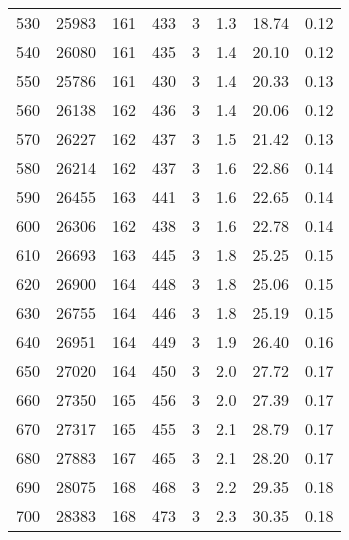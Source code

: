 \begin{table}
\begin{tabular}{S S S S S S S S }
530  & 25983  & 161  & 433  & 3  & 1.3  & 18.74  & 0.12\\ 
540  & 26080  & 161  & 435  & 3  & 1.4  & 20.10  & 0.12\\ 
550  & 25786  & 161  & 430  & 3  & 1.4  & 20.33  & 0.13\\ 
560  & 26138  & 162  & 436  & 3  & 1.4  & 20.06  & 0.12\\ 
570  & 26227  & 162  & 437  & 3  & 1.5  & 21.42  & 0.13\\ 
580  & 26214  & 162  & 437  & 3  & 1.6  & 22.86  & 0.14\\ 
590  & 26455  & 163  & 441  & 3  & 1.6  & 22.65  & 0.14\\ 
600  & 26306  & 162  & 438  & 3  & 1.6  & 22.78  & 0.14\\ 
610  & 26693  & 163  & 445  & 3  & 1.8  & 25.25  & 0.15\\ 
620  & 26900  & 164  & 448  & 3  & 1.8  & 25.06  & 0.15\\ 
630  & 26755  & 164  & 446  & 3  & 1.8  & 25.19  & 0.15\\ 
640  & 26951  & 164  & 449  & 3  & 1.9  & 26.40  & 0.16\\ 
650  & 27020  & 164  & 450  & 3  & 2.0  & 27.72  & 0.17\\ 
660  & 27350  & 165  & 456  & 3  & 2.0  & 27.39  & 0.17\\ 
670  & 27317  & 165  & 455  & 3  & 2.1  & 28.79  & 0.17\\ 
680  & 27883  & 167  & 465  & 3  & 2.1  & 28.20  & 0.17\\ 
690  & 28075  & 168  & 468  & 3  & 2.2  & 29.35  & 0.18\\ 
700  & 28383  & 168  & 473  & 3  & 2.3  & 30.35  & 0.18\\ 
\bottomrule 
\end{tabular} 
\end{table}